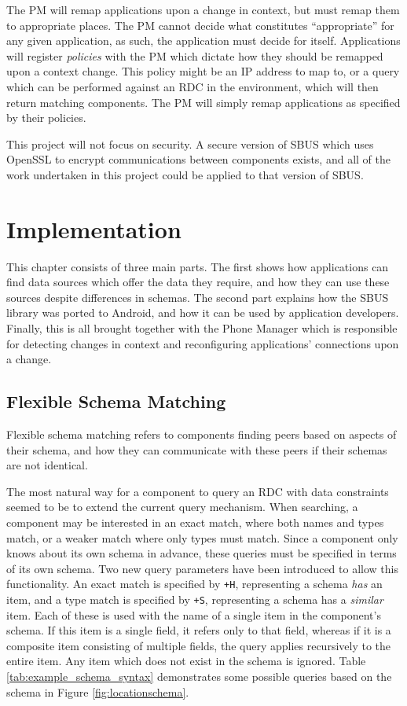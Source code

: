 \documentclass[12pt,twoside,notitlepage]{report}
\begin{document}
The PM will remap applications upon a change in context, but must remap them to appropriate places. 
The PM cannot decide what constitutes ``appropriate'' for any given application, as such, the application must decide for itself. 
Applications will register {\sl policies} with the PM which dictate how they should be remapped upon a context change. 
This policy might be an IP address to map to, or a query which can be performed against an RDC in the environment, which will then return matching components. 
The PM will simply remap applications as specified by their policies.

This project will not focus on security. 
A secure version of SBUS which uses OpenSSL to encrypt communications between components exists, and all of the work undertaken in this project could be applied to that version of SBUS.

\cleardoublepage


\chapter{Implementation}

This chapter consists of three main parts. 
The first shows how applications can find data sources which offer the data they require, and how they can use these sources despite differences in schemas. 
The second part explains how the SBUS library was ported to Android, and how it can be used by application developers. 
Finally, this is all brought together with the Phone Manager which is responsible for detecting changes in context and reconfiguring applications' connections upon a change.

\section{Flexible Schema Matching}

Flexible schema matching refers to components finding peers based on aspects of their schema, and how they can communicate with these peers if their schemas are not identical. 

The most natural way for a component to query an RDC with data constraints seemed to be to extend the current query mechanism. 
When searching, a component may be interested in an exact match, where both names and types match, or a weaker match where only types must match. 
Since a component only knows about its own schema in advance, these queries must be specified in terms of its own schema.
Two new query parameters have been introduced to allow this functionality. 
An exact match is specified by {\tt +H}, representing a schema {\sl has} an item, and a type match is specified by {\tt +S}, representing a schema has a {\sl similar} item.
Each of these is used with the name of a single item in the component's schema.
If this item is a single field, it refers only to that field, whereas if it is a composite item consisting of multiple fields, the query applies recursively to the entire item. 
Any item which does not exist in the schema is ignored. 
Table \ref{tab:example_schema_syntax} demonstrates some possible queries based on the schema in Figure \ref{fig:locationschema}.
\end{document}
